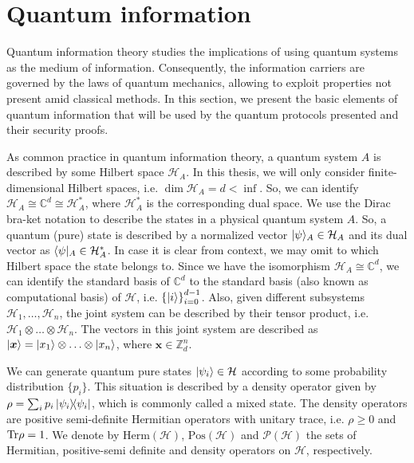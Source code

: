 \section{Quantum information}

Quantum information theory studies the implications of using quantum systems as the medium of information. Consequently, the information carriers are governed by the laws of quantum mechanics, allowing to exploit properties not present amid classical methods. In this section, we present the basic elements of quantum information that will be used by the quantum protocols presented and their security proofs.

As common practice in quantum information theory, a quantum system $A$ is described by some Hilbert space $\mathcal{H}_A$. In this thesis, we will only consider finite-dimensional Hilbert spaces, i.e. $\dim \mathcal{H}_A = d < \inf$. So, we can identify $\mathcal{H}_A \cong \mathbb{C}^d \cong \mathcal{H}^{*}_A$, where $\mathcal{H}^{*}_A$ is the corresponding dual space. We use the Dirac bra-ket notation to describe the states in a physical quantum system $A$. So, a quantum (pure) state is described by a normalized vector $| \psi \rangle_A\in\mathcal{H}_A$ and its dual vector as $\langle \psi |_A\in\mathcal{H}^{*}_A$. In case it is clear from context, we may omit to which Hilbert space the state belongs to. Since we have the isomorphism $\mathcal{H}_A \cong \mathbb{C}^d$, we can identify the standard basis of $\mathbb{C}^d$ to the standard basis (also known as computational basis) of $\mathcal{H}$, i.e. $\left\{ | i \rangle \right\}_{i=0}^{d-1}$. Also, given different subsystems $\mathcal{H}_1, \ldots, \mathcal{H}_n$, the joint system can be described by their tensor product, i.e. $\mathcal{H}_1 \otimes \ldots \otimes \mathcal{H}_n$. The vectors in this joint system are described as $| \bm{x} \rangle = | x_1 \rangle \otimes \ldots \otimes | x_n \rangle$, where $\bm{x} \in \mathbb{Z}_d^n$.

We can generate quantum pure states $| \psi_i \rangle\in \mathcal{H}$ according to some probability distribution $\{p_i\}$. This situation is described by a density operator given by $\rho = \sum_i p_i \ketbra{\psi_i}$, which is commonly called a mixed state. The density operators are positive semi-definite Hermitian operators with unitary trace, i.e. $\rho \geq 0$ and $\text{Tr} \rho = 1$. We denote by $\text{Herm}(\mathcal{H})$, $\text{Pos}(\mathcal{H})$  and $\mathcal{P}(\mathcal{H})$ the sets of Hermitian, positive-semi definite and density operators on $\mathcal{H}$, respectively.

